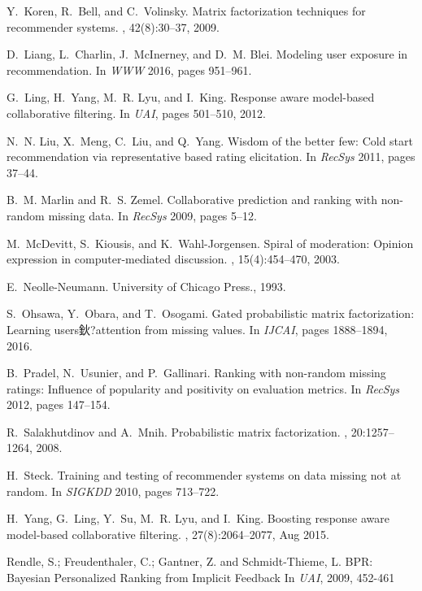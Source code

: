 \documentclass[sigconf]{acmart}
\begin{document}
\begin{thebibliography}{10}
Y.~Koren, R.~Bell, and C.~Volinsky.
\newblock Matrix factorization techniques for recommender systems.
, 42(8):30--37, 2009.

D.~Liang, L.~Charlin, J.~McInerney, and D.~M. Blei.
\newblock Modeling user exposure in recommendation.
\newblock In {\em WWW } 2016, pages 951--961.

G.~Ling, H.~Yang, M.~R. Lyu, and I.~King.
\newblock Response aware model-based collaborative filtering.
\newblock In {\em UAI}, pages 501--510, 2012.

N.~N. Liu, X.~Meng, C.~Liu, and Q.~Yang.
\newblock Wisdom of the better few: Cold start recommendation via
  representative based rating elicitation.
\newblock In {\em  RecSys } 2011, pages 37--44.

B.~M. Marlin and R.~S. Zemel.
\newblock Collaborative prediction and ranking with non-random missing data.
\newblock In {\em RecSys}  2009, pages 5--12.

M.~McDevitt, S.~Kiousis, and K.~Wahl-Jorgensen.
\newblock Spiral of moderation: Opinion expression in computer-mediated
  discussion.
,
  15(4):454--470, 2003.

E.~Neolle-Neumann.
\newblock University of Chicago Press., 1993.

S.~Ohsawa, Y.~Obara, and T.~Osogami.
\newblock Gated probabilistic matrix factorization: Learning users鈥?attention
  from missing values.
\newblock In {\em IJCAI}, pages 1888--1894, 2016.

B.~Pradel, N.~Usunier, and P.~Gallinari.
\newblock Ranking with non-random missing ratings: Influence of popularity and
  positivity on evaluation metrics.
\newblock In {\em RecSys } 2012, pages 147--154.

R.~Salakhutdinov and A.~Mnih.
\newblock Probabilistic matrix factorization.
,
  20:1257--1264, 2008.

H.~Steck.
\newblock Training and testing of recommender systems on data missing not at
  random.
\newblock In {\em SIGKDD } 2010, pages 713--722.

H.~Yang, G.~Ling, Y.~Su, M.~R. Lyu, and I.~King.
\newblock Boosting response aware model-based collaborative filtering.
,
  27(8):2064--2077, Aug 2015.

 Rendle, S.; Freudenthaler, C.; Gantner, Z. and Schmidt-Thieme, L.
 \newblock BPR: Bayesian Personalized Ranking from Implicit Feedback
 \newblock In {\em UAI}, 2009, 452-461

\end{thebibliography}

\end{document}
